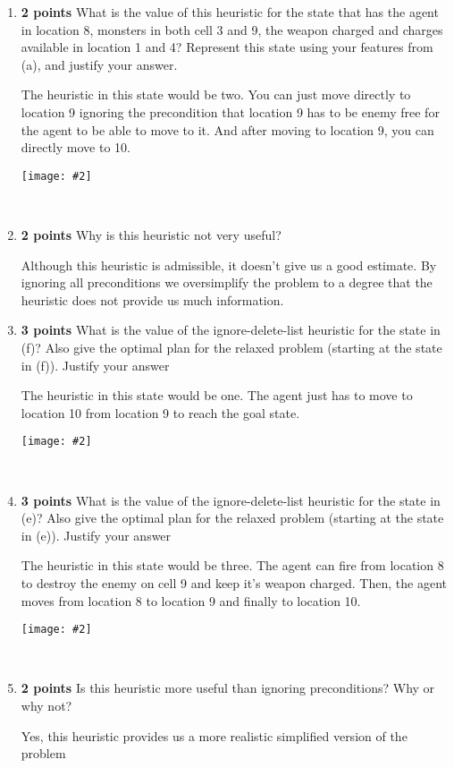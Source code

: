 \documentclass{article}
\def\ans#1{{\color{ans}#1}}
\newcommand{\centerfig}[2]{\begin{center}\texttt{[image: \#2]}\end{center}}
\begin{document}
\begin{enumerate}[label=(\alph*)]
\ans{
        The heuristic in this state would be one. The agent just has to move to location 10 from location 9 to reach the goal state.
    }  \\
    \centerfig{0.1}{../figs/1-e.png} \\
    \item \textbf{2 points} What is the value of this heuristic for the state that has the agent in location 8, monsters in
both cell 3 and 9, the weapon charged and charges available in location 1 and 4? Represent this state
using your features from (a), and justify your answer.

\ans{
        The heuristic in this state would be two. You can just move directly to location 9 ignoring the precondition that location 9 has to be enemy free for the agent to be able to move to it. And after moving to location 9, you can directly move to 10.
    }  \\
	\centerfig{0.1}{../figs/1-f.png} \\
    \item \textbf{2 points} Why is this heuristic not very useful?
    
    \ans{
        Although this heuristic is admissible, it doesn't give us a good estimate. By ignoring all preconditions we oversimplify the problem to a degree that the heuristic does not provide us much information.
    }  \\
    
    \item \textbf{3 points} What is the value of the ignore-delete-list heuristic for the state in  		(f)? Also give the
	optimal plan for the relaxed problem (starting at the state in (f)). Justify your 		  	  answer
    
     \ans{
         The heuristic in this state would be one. The agent just has to move to location 10 from location 9 to reach the goal state.
    }  \\
    \centerfig{0.3}{../figs/1-h.png} \\
    
	\item \textbf{3 points} What is the value of the ignore-delete-list heuristic for the state in (e)? Also give the optimal plan for the relaxed problem (starting at the state in (e)). Justify your answer
    
         \ans{
       The heuristic in this state would be three. The agent can fire from location 8 to destroy the enemy on cell 9 and keep it's weapon charged. Then, the agent moves from location 8 to location 9 and finally to location 10.
    }  \\
    
    \centerfig{0.4}{../figs/1-i.png} \\
    
	\item \textbf{2 points} Is this heuristic more useful than ignoring preconditions? Why or why not? 
    
     \ans{
        Yes, this heuristic provides us a more realistic simplified version of the problem 
    }  \\
    
\end{enumerate}
\end{document}
